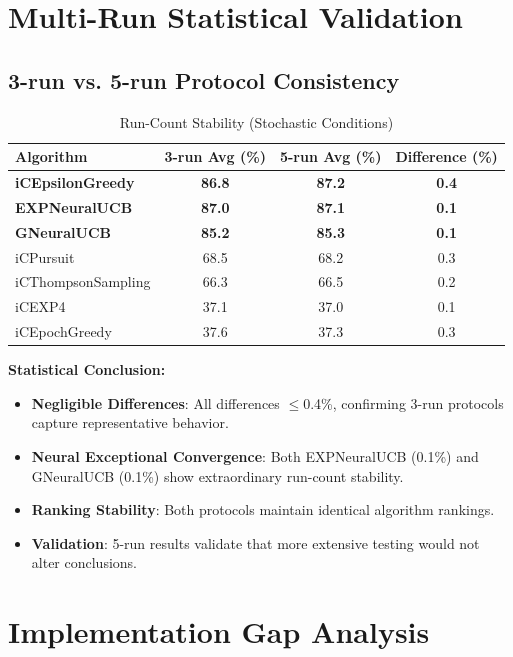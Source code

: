\documentclass[12pt,a4paper]{article}
\newcommand{\success}[1]{\textcolor{accentgreen}{\textbf{#1}}}
\newcommand{\legacy}[1]{\textcolor{legacycolor}{\textbf{#1}}}
\newcommand{\neural}[1]{\textcolor{neuralcolor}{\textbf{#1}}}
\begin{document}
\section{Multi-Run Statistical Validation}

\subsection{3-run vs. 5-run Protocol Consistency}

\begin{table}[H]
\centering
\caption{Run-Count Stability (Stochastic Conditions)}
\label{tab:run-count}
\begin{tabular}{@{}lccc@{}}
\toprule
\textbf{Algorithm} & \textbf{3-run Avg (\%)} & \textbf{5-run Avg (\%)} & \textbf{Difference (\%)} \\
\midrule
\success{iCEpsilonGreedy}   & \success{86.8} & \success{87.2} & \success{0.4} \\
\legacy{EXPNeuralUCB}       & \legacy{87.0} & \legacy{87.1} & \legacy{0.1} \\
\neural{GNeuralUCB}        & \neural{85.2} & \neural{85.3} & \neural{0.1} \\
iCPursuit                   & 68.5 & 68.2 & 0.3 \\
iCThompsonSampling          & 66.3 & 66.5 & 0.2 \\
iCEXP4                      & 37.1 & 37.0 & 0.1 \\
iCEpochGreedy               & 37.6 & 37.3 & 0.3 \\
\bottomrule
\end{tabular}
\end{table}

\textbf{Statistical Conclusion:}
\begin{itemize}
\item \success{Negligible Differences}: All differences $\leq$0.4\%, confirming 3-run protocols capture representative behavior.
\item \neural{Neural Exceptional Convergence}: Both EXPNeuralUCB (0.1\%) and GNeuralUCB (0.1\%) show extraordinary run-count stability.
\item \success{Ranking Stability}: Both protocols maintain identical algorithm rankings.
\item \success{Validation}: 5-run results validate that more extensive testing would not alter conclusions.
\end{itemize}

\section{Implementation Gap Analysis}
\end{document}
